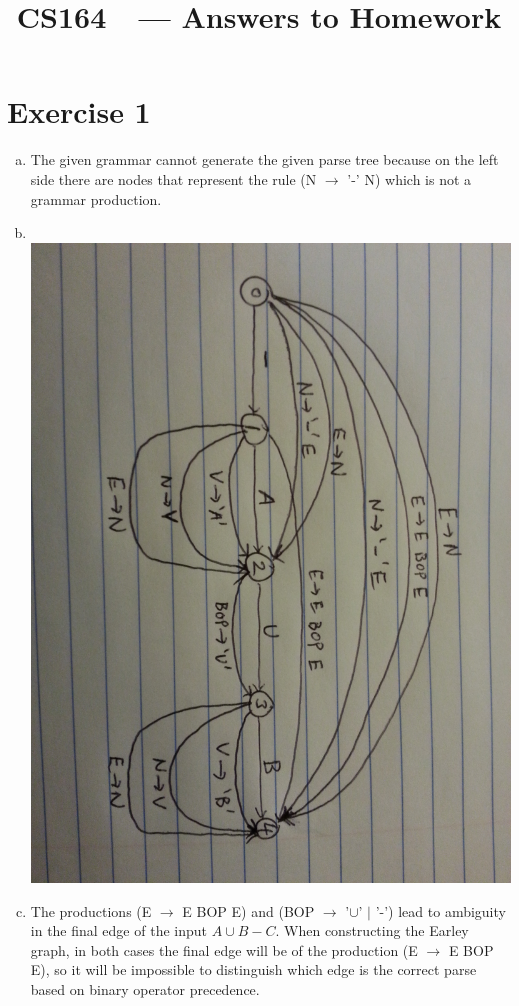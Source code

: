 \documentclass[11pt]{article}
\title{CS164\ \Session\  --- Answers to Homework \Homework}
\author{\Name}
\begin{document}
\maketitle
{}
\setcounter{problemnumber}{0}

\section*{Exercise 1}
\begin{enumerate}[(a)]
\item The given grammar cannot generate the given parse tree because on the left side there are nodes that represent the rule (N $\to$ '-' N) which is not a grammar production.
\item $\phantom{A}$ \\
\includegraphics[scale=0.125]{earley}
\item The productions (E $\to$ E BOP E) and (BOP $\to$ '$\cup$' $|$ '-') lead to ambiguity in the final edge of the input $A \cup B - C$. When constructing the Earley graph, in both cases the final edge will be of the production (E $\to$ E BOP E), so it will be impossible to distinguish which edge is the correct parse based on binary operator precedence.

\end{enumerate}
\end{document}
